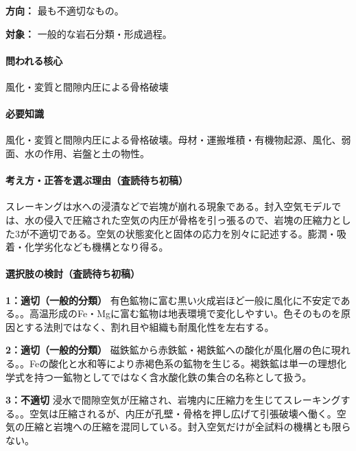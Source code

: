 \noindent\textbf{方向：} 最も不適切なもの。\par

\noindent\textbf{対象：} 一般的な岩石分類・形成過程。\par

\paragraph{問われる核心} 風化・変質と間隙内圧による骨格破壊

\paragraph{必要知識} 風化・変質と間隙内圧による骨格破壊。母材・運搬堆積・有機物起源、風化、弱面、水の作用、岩盤と土の物性。

\paragraph{考え方・正答を選ぶ理由（査読待ち初稿）} スレーキングは水への浸漬などで岩塊が崩れる現象である。封入空気モデルでは、水の侵入で圧縮された空気の内圧が骨格を引っ張るので、岩塊の圧縮力とした3が不適切である。空気の状態変化と固体の応力を別々に記述する。膨潤・吸着・化学劣化なども機構となり得る。

\paragraph{選択肢の検討（査読待ち初稿）}\mbox{}\par

\noindent\textbf{1：適切（一般的分類）} 有色鉱物に富む黒い火成岩ほど一般に風化に不安定である。。高温形成のFe・Mgに富む鉱物は地表環境で変化しやすい。色そのものを原因とする法則ではなく、割れ目や組織も耐風化性を左右する。\par

\noindent\textbf{2：適切（一般的分類）} 磁鉄鉱から赤鉄鉱・褐鉄鉱への酸化が風化層の色に現れる。。Feの酸化と水和等により赤褐色系の鉱物を生じる。褐鉄鉱は単一の理想化学式を持つ一鉱物としてではなく含水酸化鉄の集合の名称として扱う。\par

\noindent\textbf{3：不適切} 浸水で間隙空気が圧縮され、岩塊内に圧縮力を生じてスレーキングする。。空気は圧縮されるが、内圧が孔壁・骨格を押し広げて引張破壊へ働く。空気の圧縮と岩塊への圧縮を混同している。封入空気だけが全試料の機構とも限らない。\par

